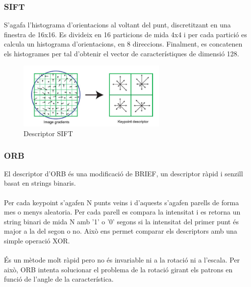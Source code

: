 	\subsubsection{SIFT}
	S'agafa l'histograma d'orientacions al voltant del punt, discretitzant en una finestra de 16x16.
	Es divideix en 16 particions de mida 4x4 i per cada partició es calcula un histograma d'orientacions, en 8 direccions.
	Finalment, es concatenen els histogrames per tal d'obtenir el vector de característiques de dimensió 128.
	\begin{figure}[H]
		\centering
		\includegraphics[width=0.65\textwidth]{images/sift-des}
		\caption{Descriptor SIFT}
	\end{figure}

	\subsubsection{ORB}
	El descriptor d'ORB és una modificació de BRIEF, un descriptor ràpid i senzill basat en strings binaris.\\\\
	Per cada keypoint s'agafen N punts veins i d'aquests s'agafen parells de forma mes o menys aleatoria. Per cada parell es compara la intensitat i es retorna un string binari de mida N amb '1' o '0' segons
	si la intensitat del primer punt és major a la del segon o no. Això ens permet comparar els descriptors amb una simple operació XOR.\\\\
	És un mètode molt ràpid pero no és invariable ni a la rotació ni a l'escala. Per això, ORB intenta solucionar el problema de la rotació girant els patrons en funció de l'angle de la característica.

